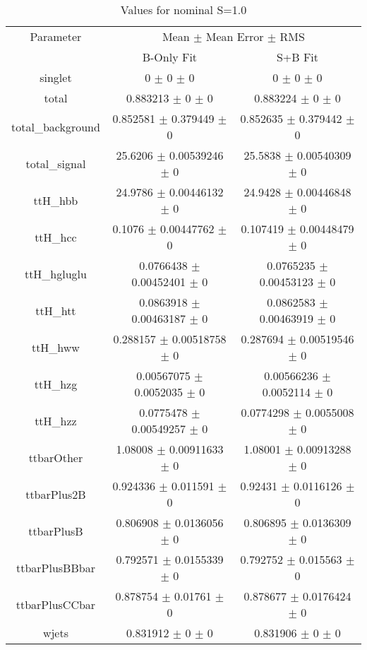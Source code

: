 \begin{table}
\centering
\caption{Values for nominal S=1.0}
\begin{tabular}{ccc}
\toprule
Parameter & \multicolumn{2}{c}{Mean $\pm$ Mean Error $\pm$ RMS}\\
 & B-Only Fit & S+B Fit\\
\midrule
singlet & \num{0} $\pm$ \num{0} $\pm$ \num{0} & \num{0} $\pm$ \num{0} $\pm$ \num{0}\\
total & \num{0.883213} $\pm$ \num{0} $\pm$ \num{0} & \num{0.883224} $\pm$ \num{0} $\pm$ \num{0}\\
total\_background & \num{0.852581} $\pm$ \num{0.379449} $\pm$ \num{0} & \num{0.852635} $\pm$ \num{0.379442} $\pm$ \num{0}\\
total\_signal & \num{25.6206} $\pm$ \num{0.00539246} $\pm$ \num{0} & \num{25.5838} $\pm$ \num{0.00540309} $\pm$ \num{0}\\
ttH\_hbb & \num{24.9786} $\pm$ \num{0.00446132} $\pm$ \num{0} & \num{24.9428} $\pm$ \num{0.00446848} $\pm$ \num{0}\\
ttH\_hcc & \num{0.1076} $\pm$ \num{0.00447762} $\pm$ \num{0} & \num{0.107419} $\pm$ \num{0.00448479} $\pm$ \num{0}\\
ttH\_hgluglu & \num{0.0766438} $\pm$ \num{0.00452401} $\pm$ \num{0} & \num{0.0765235} $\pm$ \num{0.00453123} $\pm$ \num{0}\\
ttH\_htt & \num{0.0863918} $\pm$ \num{0.00463187} $\pm$ \num{0} & \num{0.0862583} $\pm$ \num{0.00463919} $\pm$ \num{0}\\
ttH\_hww & \num{0.288157} $\pm$ \num{0.00518758} $\pm$ \num{0} & \num{0.287694} $\pm$ \num{0.00519546} $\pm$ \num{0}\\
ttH\_hzg & \num{0.00567075} $\pm$ \num{0.0052035} $\pm$ \num{0} & \num{0.00566236} $\pm$ \num{0.0052114} $\pm$ \num{0}\\
ttH\_hzz & \num{0.0775478} $\pm$ \num{0.00549257} $\pm$ \num{0} & \num{0.0774298} $\pm$ \num{0.0055008} $\pm$ \num{0}\\
ttbarOther & \num{1.08008} $\pm$ \num{0.00911633} $\pm$ \num{0} & \num{1.08001} $\pm$ \num{0.00913288} $\pm$ \num{0}\\
ttbarPlus2B & \num{0.924336} $\pm$ \num{0.011591} $\pm$ \num{0} & \num{0.92431} $\pm$ \num{0.0116126} $\pm$ \num{0}\\
ttbarPlusB & \num{0.806908} $\pm$ \num{0.0136056} $\pm$ \num{0} & \num{0.806895} $\pm$ \num{0.0136309} $\pm$ \num{0}\\
ttbarPlusBBbar & \num{0.792571} $\pm$ \num{0.0155339} $\pm$ \num{0} & \num{0.792752} $\pm$ \num{0.015563} $\pm$ \num{0}\\
ttbarPlusCCbar & \num{0.878754} $\pm$ \num{0.01761} $\pm$ \num{0} & \num{0.878677} $\pm$ \num{0.0176424} $\pm$ \num{0}\\
wjets & \num{0.831912} $\pm$ \num{0} $\pm$ \num{0} & \num{0.831906} $\pm$ \num{0} $\pm$ \num{0}\\
\bottomrule
\end{tabular}
\end{table}